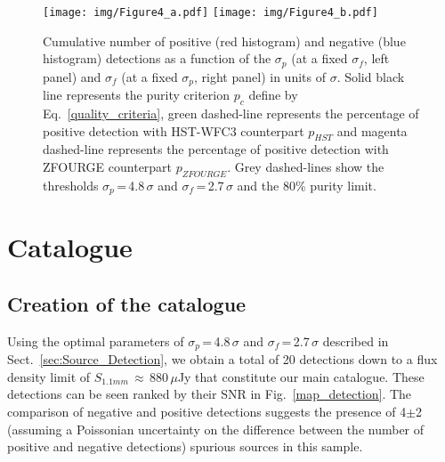 \documentclass[longauth]{aa}
\begin{document}
\begin{figure*}
\centering
\begin{minipage}[t]{1.0\textwidth}
\resizebox{\hsize}{!} {
\texttt{[image: img/Figure4\_a.pdf]}
\texttt{[image: img/Figure4\_b.pdf]}
}
\end{minipage}
\caption{Cumulative number of positive (red histogram) and negative (blue histogram) detections as a function of the $\sigma_p$ (at a fixed $\sigma_f$, left panel) and $\sigma_f$ (at a fixed $\sigma_p$, right panel) in units of $\sigma$. Solid black line represents the purity criterion  $p_{c}$ define by Eq.~\ref{quality_criteria}, green dashed-line represents the percentage of positive detection with HST-WFC3 counterpart  $p_{HST}$ and magenta dashed-line represents the percentage of positive detection with ZFOURGE counterpart  $p_{ZFOURGE}$. Grey dashed-lines show the thresholds $\sigma_p$\,=\,4.8\,$\sigma$ and $\sigma_f$\,=\,2.7\,$\sigma$  and the 80\% purity limit.}
\label{positive_negative}
\end{figure*}

\section{Catalogue}\label{sec:catalogue}
\subsection{Creation of the catalogue}\label{sec:Main_catalogue}
Using the optimal parameters of $\sigma_p$\,=\,4.8\,$\sigma$ and $\sigma_f$\,=\,2.7\,$\sigma$ described in Sect.~\ref{sec:Source_Detection}, we obtain a total of 20 detections down to a flux density limit of $S_{1.1mm}$\,$\approx$\,880\,$\mu$Jy that constitute our main catalogue. These detections can be seen ranked by their SNR in Fig.~\ref{map_detection}. The comparison of negative and positive detections suggests the presence of 4$\pm$2 (assuming a Poissonian uncertainty on the difference between the number of positive and negative detections) spurious sources in this sample. 
\end{document}
